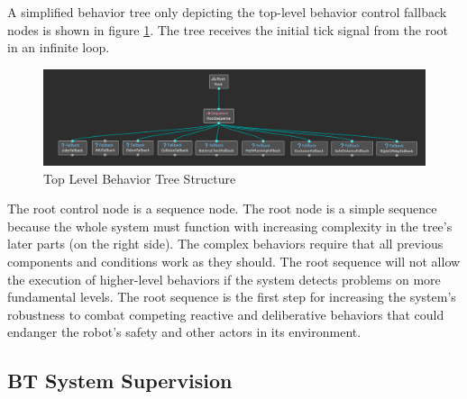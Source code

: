 A simplified behavior tree only depicting the top-level behavior control fallback nodes is shown in figure \ref{fig:top_level_bt}. The tree receives the initial tick signal from the root in an infinite loop. 
\begin{figure}[ht]
	\includegraphics[width=1.0\textwidth]{images/simplified_bt.png}
	\caption{Top Level Behavior Tree Structure}
	\label{fig:top_level_bt}
\end{figure}
The root control node is a sequence node. The root node is a simple sequence because the whole system must function with increasing complexity in the tree's later parts (on the right side). The complex behaviors require that all previous components and conditions work as they should. The root sequence will not allow the execution of higher-level behaviors if the system detects problems on more fundamental levels. The root sequence is the first step for increasing the system's robustness to combat competing reactive and deliberative behaviors that could endanger the robot's safety and other actors in its environment. 

\subsection{BT System Supervision}

